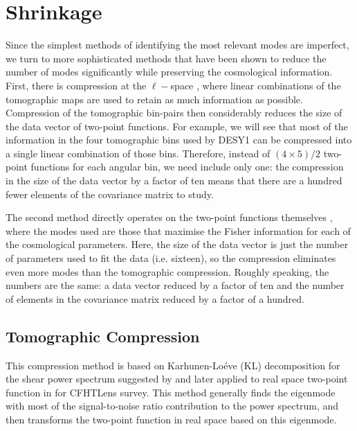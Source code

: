 \documentclass[twocolumn]{\docclass}
\begin{document}
	
	
	\section{Shrinkage}
	\label{sec:shrinkage}
	
	Since the simplest methods of identifying the most relevant modes are imperfect, we turn to more sophisticated methods \citep{Tegmark:1997maa, Joachimi:2017mnr,Gualdi:2018gmj} that have been shown to reduce the number of modes significantly while preserving the cosmological information. First, there is compression at the $\ell-$space \citep{Alonso:2017hhj}, where linear combinations of the tomographic maps are used to retain as much information as possible. Compression of the tomographic bin-pairs then considerably reduces the size of the data vector of two-point functions. For example, we will see that most of the information in the four tomographic bins used by DESY1 can be compressed into a single linear combination of those bins. Therefore, instead of $(4\times5)/2$ two-point functions for each angular bin, we need include only one: the compression in the size of the data vector by a factor of ten means that there are a hundred fewer elements of the covariance matrix to study.
	
	The second method directly operates on the two-point functions themselves \citep{Zablocki:2015zcm}, where the modes used are those that maximise the Fisher information for each of the cosmological parameters. Here, the size of the data vector is just the number of parameters used to fit the data (i.e. sixteen), so the compression eliminates even more modes than the tomographic compression. Roughly speaking, the numbers are the same: a data vector reduced by a factor of ten and the number of elements in the covariance matrix reduced by a factor of a hundred. 
	
	\subsection{Tomographic Compression}
	\label{subsec:tomographic_compression}
	
	This compression method is based on Karhunen-Lo\'eve (KL) decomposition for the shear power spectrum suggested by \citep{Alonso:2017hhj} and later applied to real space two-point function in \citep{Bellini:2019ssw} for CFHTLens survey. This method generally finds the eigenmode with most of the signal-to-noise ratio contribution to the power spectrum, and then transforms the two-point function in real space based on this eigenmode.
	
\end{document}
